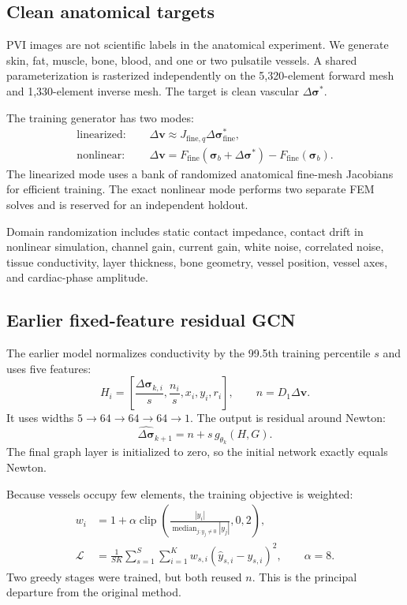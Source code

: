 \documentclass[11pt]{article}
\newcommand{\sig}{\bm{\sigma}}
\newcommand{\dv}{\Delta\bm{v}}
\newcommand{\dsig}{\Delta\bm{\sigma}}
\begin{document}
\subsection{Clean anatomical targets}

PVI images are not scientific labels in the anatomical experiment.  We generate
skin, fat, muscle, bone, blood, and one or two pulsatile vessels.  A shared
parameterization is rasterized independently on the 5,320-element forward mesh and
1,330-element inverse mesh.  The target is clean vascular $\dsig^*$.

The training generator has two modes:
\begin{align}
  \text{linearized: }&\quad \dv \approx J_{\mathrm{fine},q}\dsig^*_{\mathrm{fine}},\\
  \text{nonlinear: }&\quad \dv = F_{\mathrm{fine}}(\sig_b+\dsig^*)-F_{\mathrm{fine}}(\sig_b).
\end{align}
The linearized mode uses a bank of randomized anatomical fine-mesh Jacobians for
efficient training.  The exact nonlinear mode performs two separate FEM solves and
is reserved for an independent holdout.

Domain randomization includes static contact impedance, contact drift in nonlinear
simulation, channel gain, current gain, white noise, correlated noise, tissue
conductivity, layer thickness, bone geometry, vessel position, vessel axes, and
cardiac-phase amplitude.

\subsection{Earlier fixed-feature residual GCN}

The earlier model normalizes conductivity by the 99.5th training percentile $s$ and
uses five features:
\begin{equation}
  H_i=\left[\frac{\dsig_{k,i}}{s},\frac{n_i}{s},x_i,y_i,r_i\right],
  \qquad n=D_1\dv.
\end{equation}
It uses widths $5\to64\to64\to64\to1$.  The output is residual around Newton:
\begin{equation}
  \widehat{\dsig}_{k+1}=n+s\,g_{\theta_k}(H,G).
  \label{eq:our-residual}
\end{equation}
The final graph layer is initialized to zero, so the initial network exactly equals
Newton.

Because vessels occupy few elements, the training objective is weighted:
\begin{align}
  w_i &= 1+\alpha\operatorname{clip}
  \left(\frac{|y_i|}{\operatorname{median}_{j:y_j\ne0}|y_j|},0,2\right),\\
  \mathcal L &= \frac{1}{SK}\sum_{s=1}^{S}\sum_{i=1}^{K}
  w_{s,i}(\widehat y_{s,i}-y_{s,i})^2,
  \qquad \alpha=8.
  \label{eq:weighted-loss}
\end{align}
Two greedy stages were trained, but both reused $n$.  This is the principal
departure from the original method.
\end{document}
